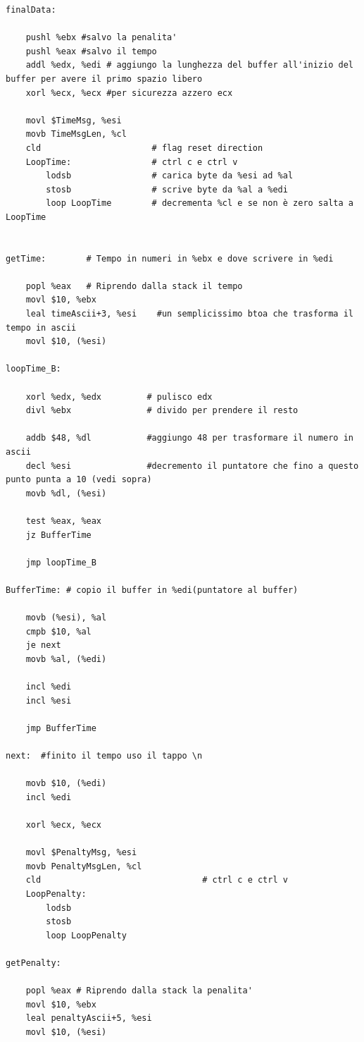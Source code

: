 \documentclass[a4paper]{report}
\begin{document}
\begin{itemize}
\begin{lstlisting}[firstnumber=1]
finalData:

    pushl %ebx #salvo la penalita'
    pushl %eax #salvo il tempo
    addl %edx, %edi # aggiungo la lunghezza del buffer all'inizio del buffer per avere il primo spazio libero
    xorl %ecx, %ecx #per sicurezza azzero ecx

    movl $TimeMsg, %esi
    movb TimeMsgLen, %cl
    cld                      # flag reset direction
    LoopTime:                # ctrl c e ctrl v
        lodsb                # carica byte da %esi ad %al
        stosb                # scrive byte da %al a %edi
        loop LoopTime        # decrementa %cl e se non è zero salta a LoopTime


getTime:        # Tempo in numeri in %ebx e dove scrivere in %edi

    popl %eax   # Riprendo dalla stack il tempo
    movl $10, %ebx     
    leal timeAscii+3, %esi    #un semplicissimo btoa che trasforma il tempo in ascii 
    movl $10, (%esi)

loopTime_B:

    xorl %edx, %edx         # pulisco edx
    divl %ebx               # divido per prendere il resto

    addb $48, %dl           #aggiungo 48 per trasformare il numero in ascii
    decl %esi               #decremento il puntatore che fino a questo punto punta a 10 (vedi sopra)
    movb %dl, (%esi)       

    test %eax, %eax       
    jz BufferTime

    jmp loopTime_B

BufferTime: # copio il buffer in %edi(puntatore al buffer)

    movb (%esi), %al
    cmpb $10, %al
    je next
    movb %al, (%edi)

    incl %edi   
    incl %esi

    jmp BufferTime

next:  #finito il tempo uso il tappo \n

    movb $10, (%edi)
    incl %edi

    xorl %ecx, %ecx 

    movl $PenaltyMsg, %esi
    movb PenaltyMsgLen, %cl
    cld                                # ctrl c e ctrl v
    LoopPenalty:
        lodsb
        stosb
        loop LoopPenalty

getPenalty: 

    popl %eax # Riprendo dalla stack la penalita'
    movl $10, %ebx     
    leal penaltyAscii+5, %esi 
    movl $10, (%esi)


\end{lstlisting}
\end{itemize}
\end{document}
